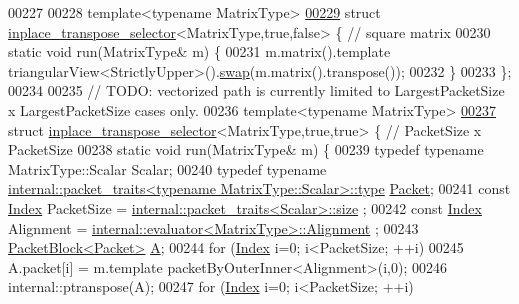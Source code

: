 \begin{DoxyCode}
00227 
00228 \textcolor{keyword}{template}<\textcolor{keyword}{typename} MatrixType>
\hyperlink{struct_eigen_1_1internal_1_1inplace__transpose__selector_3_01_matrix_type_00_01true_00_01false_01_4}{00229} \textcolor{keyword}{struct }\hyperlink{struct_eigen_1_1internal_1_1inplace__transpose__selector}{inplace\_transpose\_selector}<MatrixType,true,false> \{ \textcolor{comment}{// square matrix}
00230   \textcolor{keyword}{static} \textcolor{keywordtype}{void} run(MatrixType& m) \{
00231     m.matrix().template triangularView<StrictlyUpper>().\hyperlink{endian_8c_a3ca5ecd34b04d6a243c054ac3a57f68d}{swap}(m.matrix().transpose());
00232   \}
00233 \};
00234 
00235 \textcolor{comment}{// TODO: vectorized path is currently limited to LargestPacketSize x LargestPacketSize cases only.}
00236 \textcolor{keyword}{template}<\textcolor{keyword}{typename} MatrixType>
\hyperlink{struct_eigen_1_1internal_1_1inplace__transpose__selector_3_01_matrix_type_00_01true_00_01true_01_4}{00237} \textcolor{keyword}{struct }\hyperlink{struct_eigen_1_1internal_1_1inplace__transpose__selector}{inplace\_transpose\_selector}<MatrixType,true,true> \{ \textcolor{comment}{// PacketSize x
       PacketSize}
00238   \textcolor{keyword}{static} \textcolor{keywordtype}{void} run(MatrixType& m) \{
00239     \textcolor{keyword}{typedef} \textcolor{keyword}{typename} MatrixType::Scalar Scalar;
00240     \textcolor{keyword}{typedef} \textcolor{keyword}{typename} \hyperlink{group___sparse_core___module}{internal::packet\_traits<typename MatrixType::Scalar>::type}
       \hyperlink{union_eigen_1_1internal_1_1_packet}{Packet};
00241     \textcolor{keyword}{const} \hyperlink{namespace_eigen_a62e77e0933482dafde8fe197d9a2cfde}{Index} PacketSize = \hyperlink{struct_eigen_1_1internal_1_1packet__traits}{internal::packet\_traits<Scalar>::size}
      ;
00242     \textcolor{keyword}{const} \hyperlink{namespace_eigen_a62e77e0933482dafde8fe197d9a2cfde}{Index} Alignment = \hyperlink{struct_eigen_1_1internal_1_1evaluator}{internal::evaluator<MatrixType>::Alignment}
      ;
00243     \hyperlink{struct_eigen_1_1internal_1_1_packet_block}{PacketBlock<Packet>} \hyperlink{group___core___module_class_eigen_1_1_matrix}{A};
00244     \textcolor{keywordflow}{for} (\hyperlink{namespace_eigen_a62e77e0933482dafde8fe197d9a2cfde}{Index} i=0; i<PacketSize; ++i)
00245       A.packet[i] = m.template packetByOuterInner<Alignment>(i,0);
00246     internal::ptranspose(A);
00247     \textcolor{keywordflow}{for} (\hyperlink{namespace_eigen_a62e77e0933482dafde8fe197d9a2cfde}{Index} i=0; i<PacketSize; ++i)

\end{DoxyCode}
